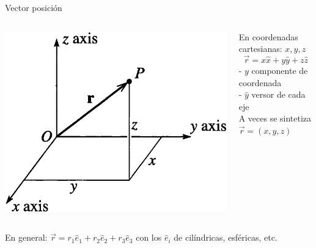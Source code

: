\documentclass[serif]{beamer}
\begin{document}
\begin{frame}
\begin{block}{Vector posición}
	\begin{columns}[c]
		\begin{column}{0.65\textwidth}
			\includegraphics[width=\textwidth]{taylor1_1}
		\end{column}
		\begin{column}{0.35\textwidth}
			En coordenadas cartesianas: \(x,y,z\)
			\[
				\vec{r}= x \hat{x}+ y \hat{y}+ z \hat{z}
			\]
			\pause
			- \(y\) componente de coordenada\\
			- \(\hat{y}\) versor de cada eje\\
			\bigskip
			\pause
			A veces se sintetiza
			\(\vec{r}= (x,y,z)\)
		\end{column}
	\end{columns}
\end{block}
\pause
\begin{block}{}
    En general: \(\vec{r}= r_1 \hat{e}_1 +  r_2 \hat{e}_2 + r_3 \hat{e}_3\) con los \(\hat{e}_i\) de cilíndricas, esféricas, etc.
\end{block}
\end{frame}
\end{document}
